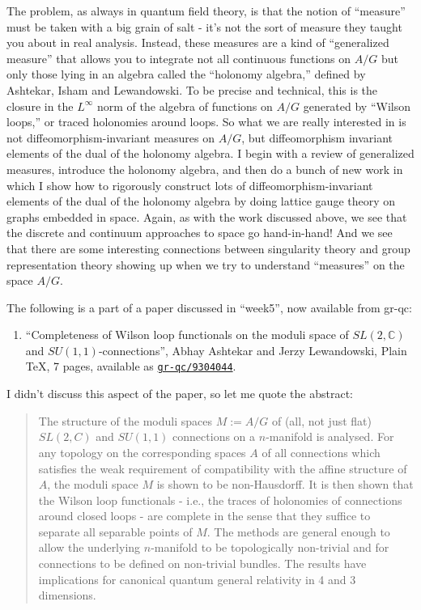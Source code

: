 \documentclass{article}
\def\tightlist{}
\begin{document}
The problem, as always in quantum field theory, is that the notion of
``measure'' must be taken with a big grain of salt - it's not the sort
of measure they taught you about in real analysis. Instead, these
measures are a kind of ``generalized measure'' that allows you to
integrate not all continuous functions on \(A/G\) but only those lying
in an algebra called the ``holonomy algebra,'' defined by Ashtekar,
Isham and Lewandowski. To be precise and technical, this is the closure
in the \(L^\infty\) norm of the algebra of functions on \(A/G\)
generated by ``Wilson loops,'' or traced holonomies around loops. So
what we are really interested in is not diffeomorphism-invariant
measures on \(A/G\), but diffeomorphism invariant elements of the dual
of the holonomy algebra. I begin with a review of generalized measures,
introduce the holonomy algebra, and then do a bunch of new work in which
I show how to rigorously construct lots of diffeomorphism-invariant
elements of the dual of the holonomy algebra by doing lattice gauge
theory on graphs embedded in space. Again, as with the work discussed
above, we see that the discrete and continuum approaches to space go
hand-in-hand! And we see that there are some interesting connections
between singularity theory and group representation theory showing up
when we try to understand ``measures'' on the space \(A/G\).

The following is a part of a paper discussed in ``week5'', now available
from gr-qc:

\begin{enumerate}
\def\labelenumi{\arabic{enumi})}
\setcounter{enumi}{3}
\tightlist
\item
  ``Completeness of Wilson loop functionals on the moduli space of
  \(SL(2,\mathbb{C})\) and \(SU(1,1)\)-connections'', Abhay Ashtekar and
  Jerzy Lewandowski, Plain TeX, 7 pages, available as
  \href{http://xxx.lanl.gov/abs/gr-qc/9304044}{\texttt{gr-qc/9304044}}.
\end{enumerate}

I didn't discuss this aspect of the paper, so let me quote the abstract:

\begin{quote}
The structure of the moduli spaces \(M := A/G\) of (all, not just flat)
\(SL(2,C)\) and \(SU(1,1)\) connections on a \(n\)-manifold is analysed.
For any topology on the corresponding spaces \(A\) of all connections
which satisfies the weak requirement of compatibility with the affine
structure of \(A\), the moduli space \(M\) is shown to be non-Hausdorff.
It is then shown that the Wilson loop functionals - i.e., the traces of
holonomies of connections around closed loops - are complete in the
sense that they suffice to separate all separable points of \(M\). The
methods are general enough to allow the underlying \(n\)-manifold to be
topologically non-trivial and for connections to be defined on
non-trivial bundles. The results have implications for canonical quantum
general relativity in 4 and 3 dimensions.
\end{quote}
\end{document}
